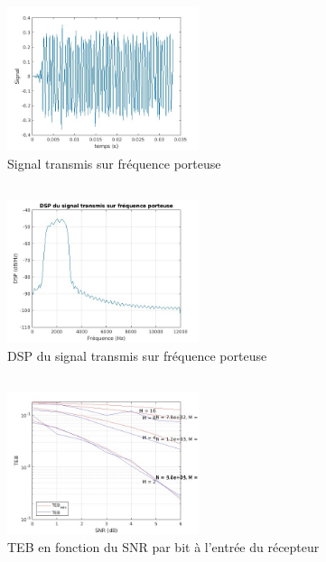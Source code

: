 \documentclass[a4paper, 12pt]{article}
\begin{document}
\subsection{}
\begin{figure}[H]
    \centering
    \includegraphics[width=0.5\textwidth]{graphics/1-2.jpg}
    \caption{Signal transmis sur fréquence porteuse}
    \label{fig:mon_etiquette}
\end{figure}

\subsection{}

\begin{figure}[H]
    \centering
    \includegraphics[width=0.5\textwidth]{graphics/1-3.jpg}
    \caption{DSP du signal transmis sur fréquence porteuse} 
    \label{fig:mon_etiquette}
\end{figure}

\subsection{}

\subsection{}

\begin{figure}[H]
    \centering
    \includegraphics[width=0.5\textwidth]{graphics/1-5.jpg}
    \caption{TEB en fonction du SNR par bit à l'entrée du récepteur}
    \label{fig:mon_etiquette}
\end{figure}
\end{document}

